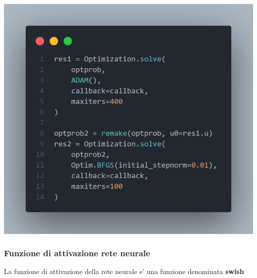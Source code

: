 \begin{minipage}{\linewidth}
	\centering
	\includegraphics[width=\textwidth]{img/optimizers_example.png}
	\label{fig:two_otpimizers}
\end{minipage}

\subsubsection*{Funzione di attivazione rete neurale}
La funzione di attivazione della rete neurale e' una funzione denominata \textbf{swish} \cite{ramachandran2017searching}
